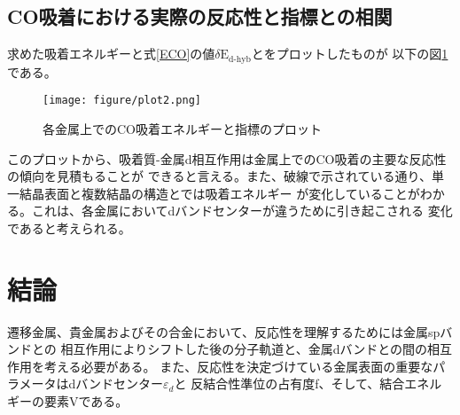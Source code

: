 \documentclass[12pt]{ltjsarticle}
\begin{document}
\subsection{CO吸着における実際の反応性と指標との相関}
求めた吸着エネルギーと式\ref{ECO}の値$\delta\text{E}_\text{d-hyb}$とをプロットしたものが
以下の図\ref{fig:coplot}である。
\begin{figure}[hbtp]
    \begin{center}
     \texttt{[image: figure/plot2.png]}
    \end{center}
    \caption{各金属上でのCO吸着エネルギーと指標のプロット}
    \label{fig:coplot}
\end{figure}

このプロットから、吸着質-金属d相互作用は金属上でのCO吸着の主要な反応性の傾向を見積もることが
できると言える。また、破線で示されている通り、単一結晶表面と複数結晶の構造とでは吸着エネルギー
が変化していることがわかる。これは、各金属においてdバンドセンターが違うために引き起こされる
変化であると考えられる。

\section{結論}
遷移金属、貴金属およびその合金において、反応性を理解するためには金属spバンドとの
相互作用によりシフトした後の分子軌道と、金属dバンドとの間の相互作用を考える必要がある。
また、反応性を決定づけている金属表面の重要なパラメータはdバンドセンター$\varepsilon_d$と
反結合性準位の占有度f、そして、結合エネルギーの要素Vである。



\end{document}
